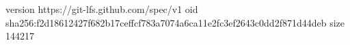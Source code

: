 version https://git-lfs.github.com/spec/v1
oid sha256:f2d18612427f682b17ceffcf783a7074a6ca11e2fc3ef2643c0dd2f871d44deb
size 144217
